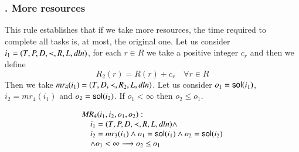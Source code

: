 












\subsubsection{. More resources}
This rule establishes that if we take more resources, the
time required to complete all tasks is, at most, the original one.
Let us consider
$i_{1}=(T, P, D, \prec, R, L, \mathit{dln})$, for each $r\in R$ we take a
positive integer $c_{r}$ and then we define
\begin{displaymath}
  R_{2}(r)=R(r)+c_{r}\quad \forall r\in R
\end{displaymath}
Then we take $mr_{4}(i_{1}) = (T, D, \prec, R_{2}, L, \mathit{dln})$.
Let us
consider $o_{1}=\mathsf{sol}(i_{1})$, $i_{2}=mr_{4}(i_{1})$ and
$o_{2}=\mathsf{sol}(i_{2})$.
If $o_{1}<\infty$ then $o_{2}\leq o_{1}$.

\begin{framed}
  \begin{displaymath}
      \begin{array}{l}
    \mathit{MR}_{4}(i_1,i_2,o_{1},o_{2}):\\
      \hskip 1em  i_1=(T,P,D,\prec,R,L,\mathit{dln}) \wedge\\
      \hskip 1em  i_2=mr_3(i_1)\wedge o_{1}=\mathsf{sol}(i_{1})\wedge o_{2}=\mathsf{sol}(i_2)\\
      \hskip 1em \wedge o_{1}<\infty
      \longrightarrow o_{2}\leq o_1
    \end{array}
  \end{displaymath}
\end{framed}





